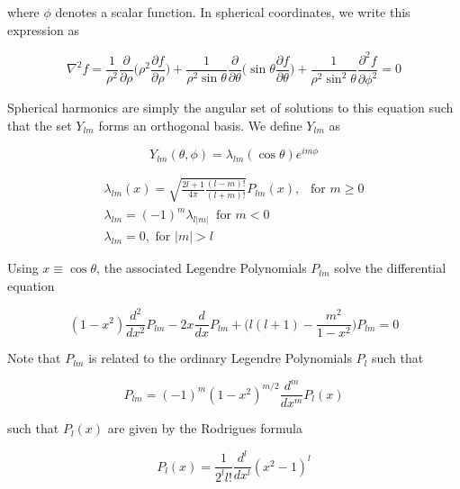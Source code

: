 \documentclass[12pt]{article}
\begin{document}
where $\phi$ denotes a scalar function. In spherical coordinates, we write this expression as 

\begin{equation}
\nabla^2 f=\frac{1}{\rho^2}\frac{\partial}{\partial\rho}\Bigg(\rho^2\frac{\partial f}{\partial\rho}\Bigg)+\frac{1}{\rho^2\sin\theta}\frac{\partial}{\partial\theta}\Bigg(\sin\theta\frac{\partial f}{\partial\theta}\Bigg)+\frac{1}{\rho^2\sin^2\theta}\frac{\partial^2 f}{\partial\phi^2}=0
\end{equation}

Spherical harmonics are simply the angular set of solutions to this equation such that the set $Y_{lm}$ forms an orthogonal basis. We define $Y_{lm}$ as

\begin{equation}
Y_{lm}(\theta, \phi)=\lambda_{lm}(\cos\theta)e^{im\phi}
\end{equation}

\begin{eqnarray*}
\lambda_{lm}(x)=\sqrt{\frac{2l+1}{4\pi}\frac{(l-m)!}{(l+m)!}}P_{lm}(x), \ \ \mbox{ for }m\geq0 \\
\lambda_{lm}=(-1)^{m}\lambda_{l|m|} \ \mbox{ for }m<0 \\
\lambda_{lm}=0, \mbox{ for } |m|>l
\end{eqnarray*}


Using $x\equiv\cos\theta$, the associated Legendre Polynomials $P_{lm}$ solve the differential equation

\begin{equation}
(1-x^2)\frac{d^2}{dx^2}P_{lm}-2x\frac{d}{dx}P_{lm}+\Bigg(l(l+1)-\frac{m^2}{1-x^2}\Bigg)P_{lm}=0
\end{equation}

Note that $P_{lm}$ is related to the ordinary Legendre Polynomials $P_l$ such that 

\begin{equation}
P_{lm}=(-1)^m(1-x^2)^{m/2}\frac{d^m}{dx^m}P_l(x)
\end{equation}

such that $P_l(x)$ are given by the Rodrigues formula

\begin{equation}
P_l(x)=\frac{1}{2^l l!}\frac{d^l}{dx^l}(x^2-1)^l
\end{equation}



 
\end{document}
